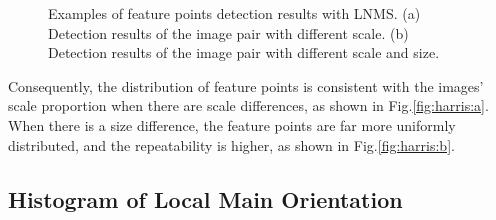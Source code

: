 \begin{figure}[!h]
    \centering
    \hfil
    \caption{Examples of feature points detection results with LNMS. (a) Detection results of the image pair with different scale. (b) Detection results of the image pair with different scale and size.}
    \label{fig:harris}
\end{figure}

Consequently, the distribution of feature points is consistent with the images' scale proportion when there are scale differences, as shown in Fig.\ref{fig:harris:a}. When there is a size difference, the feature points are far more uniformly distributed, and the repeatability is higher, as shown in Fig.\ref{fig:harris:b}.



\subsection{Histogram of Local Main Orientation}
\label{ssec:subhead}

